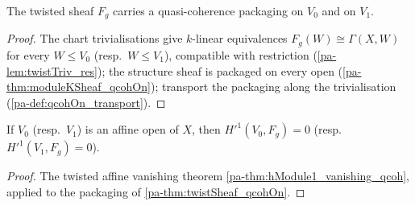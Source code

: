 \begin{theorem}
  \label{pa-thm:twistSheaf_qcohOn}
  \leanok

  The twisted sheaf \(F_g\) carries a quasi-coherence packaging on \(V_0\) and on
  \(V_1\).
\end{theorem}
\begin{proof}
  \leanok
  The chart trivialisations give \(k\)-linear equivalences
  \(F_g(W) \cong \Gamma(X, W)\) for every \(W \le V_0\) (resp.\ \(W \le V_1\)),
  compatible with restriction (\ref{pa-lem:twistTriv_res}); the structure sheaf is packaged
  on every open (\ref{pa-thm:moduleKSheaf_qcohOn}); transport the packaging along the
  trivialisation (\ref{pa-def:qcohOn_transport}).
\end{proof}

\begin{theorem}
  \label{pa-thm:twistSheaf_affine_vanishing}
  \leanok

  If \(V_0\) (resp.\ \(V_1\)) is an affine open of \(X\), then
  \(H'^1(V_0, F_g) = 0\) (resp.\ \(H'^1(V_1, F_g) = 0\)).
\end{theorem}
\begin{proof}
  \leanok
  The twisted affine vanishing theorem \ref{pa-thm:hModule1_vanishing_qcoh}, applied to the
  packaging of \ref{pa-thm:twistSheaf_qcohOn}.
\end{proof}

